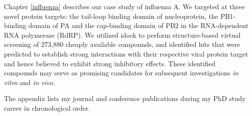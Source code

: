 Chapter \ref{influenza} describes our case study of influenza A. We targeted at three novel protein targets: the tail-loop binding domain of nucleoprotein, the PB1-binding domain of PA and the cap-binding domain of PB2 in the RNA-dependent RNA polymerase (RdRP). We utilized idock \citep{1153,1362} to perform structure-based virtual screening of 273,880 cheaply available compounds, and identified hits that were predicted to establish strong interactions with their respective viral protein target and hence believed to exhibit strong inhibitory effects. These identified compounds may serve as promising candidates for subsequent investigations \textit{in vitro} and \textit{in vivo}.

The appendix lists my journal and conference publications during my PhD study career in chronological order.

\chapterend
